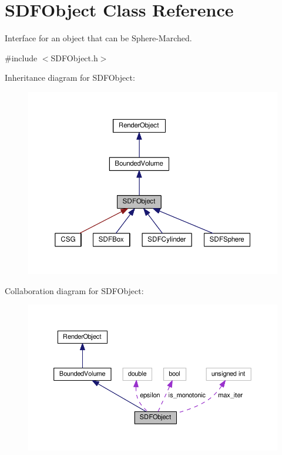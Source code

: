 \hypertarget{classSDFObject}{}\section{S\+D\+F\+Object Class Reference}
\label{classSDFObject}


Interface for an object that can be Sphere-\/\+Marched.  




{\ttfamily \#include $<$S\+D\+F\+Object.\+h$>$}



Inheritance diagram for S\+D\+F\+Object\+:
\nopagebreak
\begin{figure}[H]
\begin{center}
\leavevmode
\includegraphics[width=350pt]{classSDFObject__inherit__graph}
\end{center}
\end{figure}


Collaboration diagram for S\+D\+F\+Object\+:\nopagebreak
\begin{figure}[H]
\begin{center}
\leavevmode
\includegraphics[width=350pt]{classSDFObject__coll__graph}
\end{center}
\end{figure}
